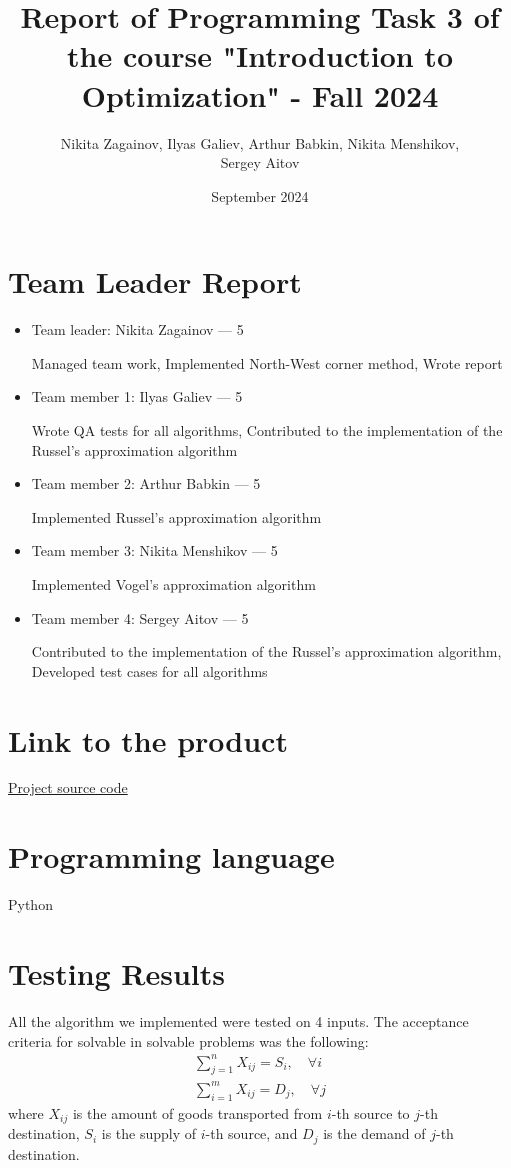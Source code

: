 \documentclass{article}
\title{Report of Programming Task 3 of the course "Introduction to Optimization" - Fall 2024}
\author{Nikita Zagainov, Ilyas Galiev, Arthur Babkin, Nikita Menshikov, \\ Sergey Aitov}
\date{September 2024}
\begin{document}
\maketitle

\section{Team Leader Report}
\noindent
\begin{itemize}
    \item Team leader: Nikita Zagainov --- 5

          Managed team work, Implemented North-West corner method, Wrote report

    \item Team member 1: Ilyas Galiev --- 5

          Wrote QA tests for all algorithms, Contributed to the implementation of the
          Russel's approximation algorithm

    \item Team member 2: Arthur Babkin --- 5

          Implemented Russel's approximation algorithm

    \item Team member 3: Nikita Menshikov --- 5

          Implemented Vogel's approximation algorithm

    \item Team member 4: Sergey Aitov --- 5

          Contributed to the implementation of the Russel's approximation algorithm,
          Developed test cases for all algorithms
\end{itemize}
\section{Link to the product}
\href{https://github.com/V1adych/transportation}{Project source code}

\section{Programming language}
Python

\section{Testing Results}
All the algorithm we implemented were tested on 4 inputs. The acceptance
criteria for solvable in solvable problems was the following:
\begin{align*}
    \sum_{j=1}^{n} X_{ij} = S_i, \quad \forall i \\
    \sum_{i=1}^{m} X_{ij} = D_j, \quad \forall j
\end{align*}
where $X_{ij}$ is the amount of goods transported from $i$-th source to $j$-th destination,
$S_i$ is the supply of $i$-th source, and $D_j$ is the demand of $j$-th destination.
\end{document}
